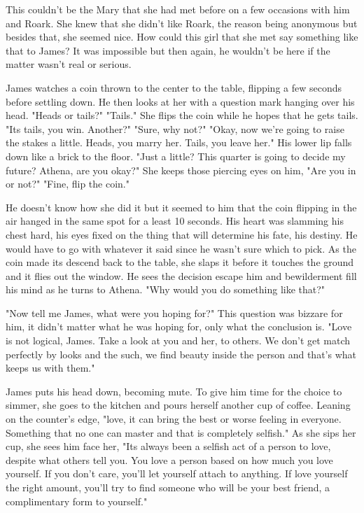        This couldn't be the Mary that she had met before on a few occasions with him and Roark. She knew that she didn't like Roark, the reason
    being anonymous but besides that, she seemed nice. How could this girl that she met say something like that to James? It was impossible but
    then again, he wouldn't be here if the matter wasn't real or serious.

        James watches a coin thrown to the center to the table, flipping a few seconds before settling down. He then looks at her with a question
    mark hanging over his head. "Heads or tails?" "Tails." She flips the coin while he hopes that he gets tails. "Its tails, you win. Another?"
    "Sure, why not?" "Okay, now we're going to raise the stakes a little. Heads, you marry her. Tails, you leave her." His lower lip falls down
    like a brick to the floor. "Just a little? This quarter is going to decide my future? Athena, are you okay?" She keeps those piercing eyes
    on him, "Are you in or not?" "Fine, flip the coin."

        He doesn't know how she did it but it seemed to him that the coin flipping in the air hanged in the same spot for a least 10 seconds. 
    His heart was slamming his chest hard, his eyes fixed on the thing that will determine his fate, his destiny. He would have to go with 
    whatever it said since he wasn't sure which to pick. As the coin made its descend back to the table, she slaps it before it touches the 
    ground and it flies out the window. He sees the decision escape him and bewilderment fill his mind as he turns to Athena. "Why would you
    do something like that?"

        "Now tell me James, what were you hoping for?" This question was bizzare for him, it didn't matter what he was hoping for, only what
    the conclusion is. "Love is not logical, James. Take a look at you and her, to others. We don't get match perfectly by looks and the such,
    we find beauty inside the person and that's what keeps us with them."

        James puts his head down, becoming mute. To give him time for the choice to simmer, she goes to the kitchen and pours herself another
    cup of coffee. Leaning on the counter's edge, "love, it can bring the best or worse feeling in everyone. Something that no one can master
    and that is completely selfish." As she sips her cup, she sees him face her, "Its always been a selfish act of a person to love, despite
    what others tell you. You love a person based on how much you love yourself. If you don't care, you'll let yourself attach to anything. If
    love yourself the right amount, you'll try to find someone who will be your best friend, a complimentary form to yourself."

